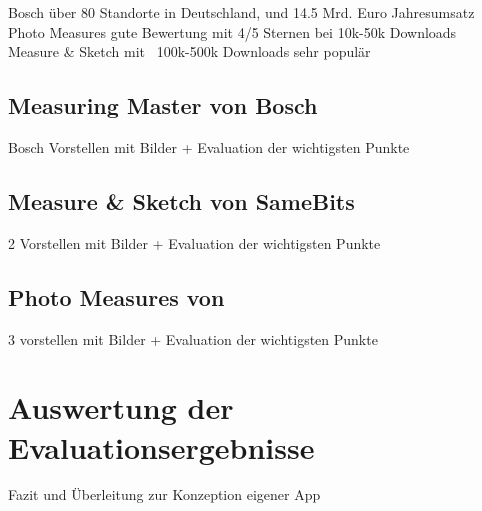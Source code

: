 Bosch über 80 Standorte in Deutschland, und 14.5 Mrd. Euro Jahresumsatz \\
Photo Measures gute Bewertung mit 4/5 Sternen bei 10k-50k Downloads \\
Measure \& Sketch mit ~100k-500k Downloads sehr populär \\

\subsection{Measuring Master von Bosch}
Bosch Vorstellen mit Bilder + Evaluation der wichtigsten Punkte
\subsection{Measure \& Sketch von SameBits}
2 Vorstellen mit Bilder + Evaluation der wichtigsten Punkte
\subsection{Photo Measures von }
3 vorstellen mit Bilder + Evaluation der wichtigsten Punkte

\section{Auswertung der Evaluationsergebnisse}
Fazit und Überleitung zur Konzeption eigener App


